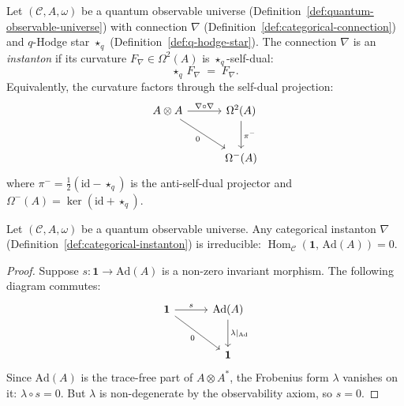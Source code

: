 
\begin{definition}
\label{def:categorical-instanton}
\leanok
Let $(\mathcal{C}, A, \omega)$ be a quantum observable universe
(Definition~\ref{def:quantum-observable-universe}) with connection
$\nabla$ (Definition~\ref{def:categorical-connection}) and
$q$-Hodge star $\star_q$ (Definition~\ref{def:q-hodge-star}).
The connection $\nabla$ is an \emph{instanton} if its curvature
$F_\nabla \in \Omega^2(A)$ is $\star_q$-self-dual:
\[
  \star_q\, F_\nabla \;=\; F_\nabla.
\]
Equivalently, the curvature factors through the self-dual projection:
\begin{equation}\label{eq:instanton-cd}
\begin{tikzcd}[row sep=2.5em, column sep=3em]
  A \otimes A \ar[r, "\nabla \circ \nabla"]
    \ar[dr, "0"']
  & \Omega^2(A) \ar[d, "\pi^-"] \\
  & \Omega^-(A)
\end{tikzcd}
\end{equation}
where $\pi^- = \tfrac{1}{2}(\mathrm{id} - \star_q)$ is the
anti-self-dual projector and $\Omega^-(A) = \ker(\mathrm{id} + \star_q)$.
\end{definition}

\begin{lemma}
\label{lem:categorical-irreducible}
\leanok
Let $(\mathcal{C}, A, \omega)$ be a quantum observable universe.
Any categorical instanton $\nabla$
(Definition~\ref{def:categorical-instanton}) is irreducible:
$\operatorname{Hom}_{\mathcal{C}}(\mathbf{1},\,\mathrm{Ad}(A)) = 0$.
\end{lemma}

\begin{proof}
Suppose $s \colon \mathbf{1} \to \mathrm{Ad}(A)$ is a non-zero
invariant morphism.  The following diagram commutes:
\[
\begin{tikzcd}[row sep=2.5em, column sep=3em]
  \mathbf{1} \ar[r, "s"] \ar[dr, "0"']
  & \mathrm{Ad}(A) \ar[d, "\lambda|_{\mathrm{Ad}}"] \\
  & \mathbf{1}
\end{tikzcd}
\]
Since $\mathrm{Ad}(A)$ is the trace-free part of $A \otimes A^*$,
the Frobenius form $\lambda$ vanishes on it:
$\lambda \circ s = 0$.  But $\lambda$ is non-degenerate by the
observability axiom, so $s = 0$.
\end{proof}

